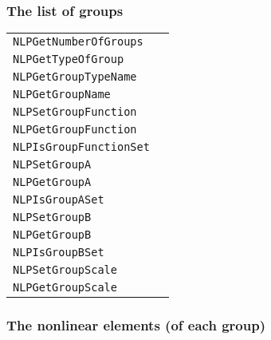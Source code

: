 \documentclass[12pt]{article}
\begin{document}
\subsubsection{The list of groups}

\begin{center}
\begin{tabular}{ll}
\tt NLPGetNumberOfGroups&\pageref{Subroutine:NLPGetNumberOfGroups}\\
\tt NLPGetTypeOfGroup&\pageref{Subroutine:NLPGetTypeOfGroup}\\
\tt NLPGetGroupTypeName&\pageref{Subroutine:NLPGetGroupTypeName}\\
\tt NLPGetGroupName&\pageref{Subroutine:NLPGetGroupName}\\
\tt NLPSetGroupFunction&\pageref{Subroutine:NLPSetGroupFunction}\\
\tt NLPGetGroupFunction&\pageref{Subroutine:NLPGetGroupFunction}\\
\tt NLPIsGroupFunctionSet&\pageref{Subroutine:NLPIsGroupFunctionSet}\\
\tt NLPSetGroupA&\pageref{Subroutine:NLPSetGroupA}\\
\tt NLPGetGroupA&\pageref{Subroutine:NLPGetGroupA}\\
\tt NLPIsGroupASet&\pageref{Subroutine:NLPIsGroupASet}\\
\tt NLPSetGroupB&\pageref{Subroutine:NLPSetGroupB}\\
\tt NLPGetGroupB&\pageref{Subroutine:NLPGetGroupB}\\
\tt NLPIsGroupBSet&\pageref{Subroutine:NLPIsGroupBSet}\\
\tt NLPSetGroupScale&\pageref{Subroutine:NLPSetGroupScale}\\
\tt NLPGetGroupScale&\pageref{Subroutine:NLPGetGroupScale}\\
\end{tabular}
\end{center}

\subsubsection{The nonlinear elements (of each group)}
\end{document}
